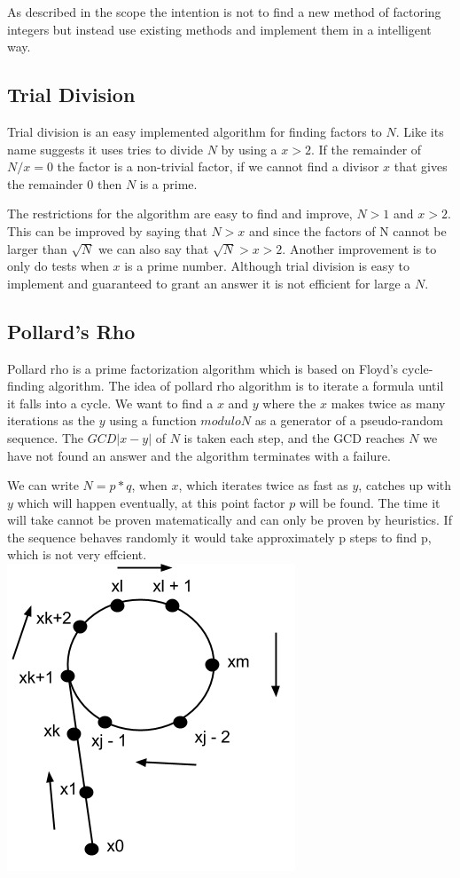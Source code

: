 As described in the scope the intention is not to find a new method of factoring integers but instead use existing methods and implement them in a intelligent way.

\subsection{Trial Division}
Trial division is an easy implemented algorithm for finding factors to $N$. Like its name suggests it uses tries to divide $N$ by using a $x > 2$. If the remainder of $N/x = 0$ the factor is a non-trivial factor, if we cannot find a divisor $x$ that gives the remainder $0$ then $N$ is a prime.

The restrictions for the algorithm are easy to find and improve, $N > 1$ and $x > 2$. This can be improved by saying that $N > x$ and since the factors of N cannot be larger than $\sqrt{N}$ we can also say that $\sqrt{N} > x > 2$. Another improvement is to only do tests when $x$ is a prime number. Although trial division is easy to implement and guaranteed to grant an answer it is not efficient for large a $N$.

\subsection{Pollard's Rho}
Pollard rho is a prime factorization algorithm which is based on Floyd’s cycle-finding algorithm. The idea of pollard rho algorithm is to iterate a formula until it falls into a cycle. We want to find a $x$ and $y$ where the $x$ makes twice as many iterations as the $y$ using a function $modulo N$ as a generator of a pseudo-random sequence. The $GCD|x - y|$ of $N$ is taken each step, and the GCD reaches $N$ we have not found an answer and the algorithm terminates with a failure.

We can write $N = p * q$, when $x$, which iterates twice as fast as $y$, catches up with $y$ which will happen eventually, at this point factor $p$ will be found. The time it will take cannot be proven matematically and can only be proven by heuristics. If the sequence behaves randomly it would take approximately p steps to find p, which is not very effcient. \cite{avalg} \\

\includegraphics[scale = 0.5]{pollards.png}

